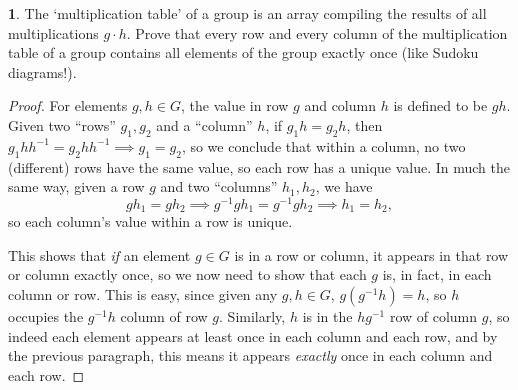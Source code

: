 \documentclass{article}
\theoremstyle{definition}
\newtheorem{ex}{}[section]
\begin{document}
\begin{ex}
	The `multiplication table' of a group is an array compiling the results of all multiplications $g \cdot h$.
	Prove that every row and every column of the multiplication table of a group contains all elements of the group exactly once (like Sudoku diagrams!).
\end{ex}
\begin{proof}
	For elements $g, h \in G$, the value in row $g$ and column $h$ is defined to be $gh$.
	Given two ``rows'' $g_1, g_2$ and a ``column'' $h$, if $g_1h = g_2h$, then $g_1hh^{-1} = g_2hh^{-1} \implies g_1 = g_2$, so we conclude that within a column, no two (different) rows have the same value, so each row has a unique value.
	In much the same way, given a row $g$ and two ``columns'' $h_1, h_2$, we have \begin{equation*}
		gh_1 = gh_2 \implies g^{-1}gh_1 = g^{-1}gh_2 \implies h_1 = h_2,
	\end{equation*}
	so each column's value within a row is unique.

	This shows that \textit{if} an element $g \in G$ is in a row or column, it appears in that row or column exactly once, so we now need to show that each $g$ is, in fact, in each column or row.
	This is easy, since given any $g, h \in G$, $g(g^{-1}h) = h$, so $h$ occupies the $g^{-1}h$ column of row $g$.
	Similarly, $h$ is in the $hg^{-1}$ row of column $g$, so indeed each element appears at least once in each column and each row, and by the previous paragraph, this means it appears \textit{exactly} once in each column and each row.
\end{proof}
\end{document}
